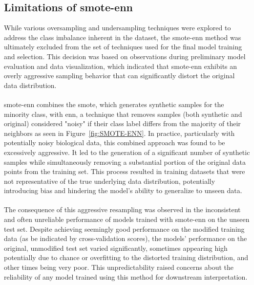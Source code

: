 \documentclass[12pt,a4paper]{report}
\begin{document}
\subsection{Limitations of \gls{smote}-\gls{enn}}
\noindent
While various oversampling and undersampling techniques were explored to address the class imbalance inherent in the dataset, the \gls{smote}-\gls{enn} method was ultimately excluded from the set of techniques used for the final model training and selection. This decision was based on observations during preliminary model evaluation and data visualization, which indicated that \gls{smote}-\gls{enn} exhibits an overly aggressive sampling behavior that can significantly distort the original data distribution.\\
\\
\gls{smote}-\gls{enn} combines the \acrfull{smote}, which generates synthetic samples for the minority class, with \acrfull{enn}, a technique that removes samples (both synthetic and original) considered "noisy" if their class label differs from the majority of their neighbors as seen in Figure~\ref{fig:SMOTE-ENN}. In practice, particularly with potentially noisy biological data, this combined approach was found to be excessively aggressive. It led to the generation of a significant number of synthetic samples while simultaneously removing a substantial portion of the original data points from the training set. This process resulted in training datasets that were not representative of the true underlying data distribution, potentially introducing bias and hindering the model's ability to generalize to unseen data.\\
\\
The consequence of this aggressive resampling was observed in the inconsistent and often unreliable performance of models trained with \gls{smote}-\gls{enn} on the unseen test set. Despite achieving seemingly good performance on the modified training data (as be indicated by cross-validation scores), the models' performance on the original, unmodified test set varied significantly, sometimes appearing high potentially due to chance or overfitting to the distorted training distribution, and other times being very poor. This unpredictability raised concerns about the reliability of any model trained using this method for downstream interpretation.\\
\end{document}
